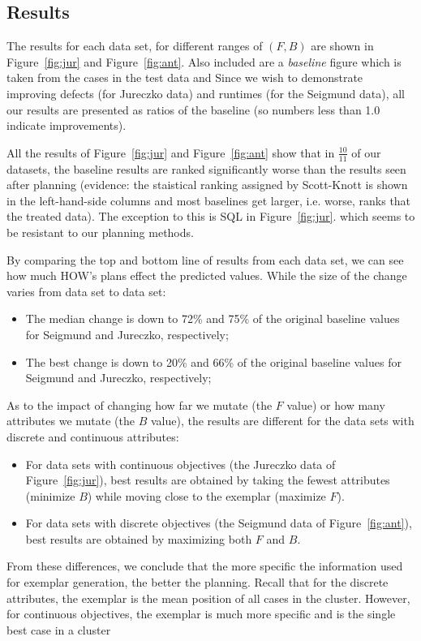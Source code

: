 \documentclass[conference]{IEEEtran}
\newcommand{\bi}{\begin{itemize}}
\newcommand{\ei}{\end{itemize}}
\newcommand{\fig}[1]{Figure~\ref{fig:#1}}
\begin{document}
  
\subsection{Results}
The results for each data set, for different ranges of $(F,B)$ are shown in \fig{jur} and \fig{ant}.
Also included are a {\em baseline} figure which is taken from the cases in the test data
and  Since we wish to demonstrate
improving defects
(for Jureczko data) and runtimes (for the Seigmund data), all our results are presented as ratios of the baseline (so numbers less than 1.0 indicate improvements).

  
 All the results of \fig{jur} and \fig{ant} show that in $\frac{10}{11}$ of our
 datasets, the baseline results are ranked significantly worse than the results seen
 after planning (evidence: the staistical ranking assigned by Scott-Knott is shown in the left-hand-side columns and most baselines get larger, i.e. worse, ranks
 that the treated data). The exception to this is SQL in  \fig{jur}. which
 seems to
 be resistant to our planning methods.
 
 By comparing the top and bottom line of results from each data set, we can see how much HOW's
 plans effect the predicted values. While the  size of the change varies from data set to data set:
 \bi
 \item The median change is down to 72\% and 75\%  of the original baseline values for Seigmund and Jureczko, respectively;
 \item The best change is down to 20\% and 66\% of the original baseline values for Seigmund and Jureczko, respectively;
 \ei
 As to the impact of changing how far we mutate (the $F$ value) or how many attributes
 we mutate (the $B$ value), the results are different for the data sets with discrete and continuous attributes:
 \bi
 \item For data sets with continuous objectives (the Jureczko data of \fig{jur}),
 best results are obtained by taking the fewest attributes (minimize $B$) 
 while moving close to the exemplar (maximize $F$).
 \item For data sets with discrete objectives (the Seigmund data  of \fig{ant}),
 best results are obtained by maximizing both $F$ and $B$.
 \ei
  From these differences, we conclude that the more specific the  information used for exemplar
 generation, the better the planning. Recall that for the discrete
 attributes, the exemplar is the mean position of all cases in the cluster.
 However,  for continuous
 objectives, the exemplar is much more specific and is the  single  best case in a cluster 
\end{document}
